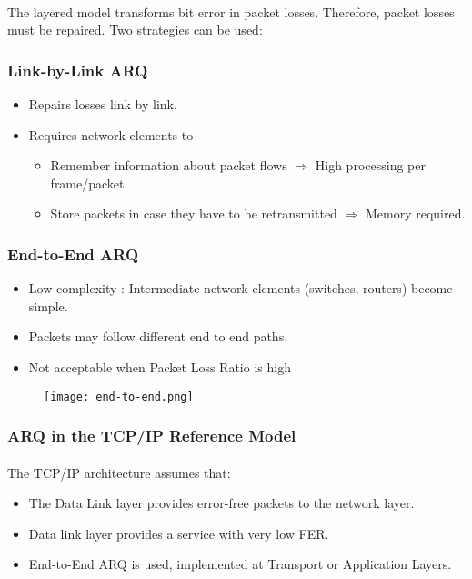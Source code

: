 \documentclass[../resumosRCOM.tex]{subfiles}
\begin{document}
\paragraph{}
The layered model transforms bit error in packet losses.
Therefore, packet losses must be repaired.
Two strategies can be used:
\subsubsection{Link-by-Link ARQ}
\begin{itemize}
    \item Repairs losses link by link.
    \item Requires network elements to 
    \begin{itemize}
        \item Remember information about packet flows $\Rightarrow$ High processing 
        per frame/packet.
        \item Store packets in case they have to be retransmitted $\Rightarrow$
        Memory required.
    \end{itemize}
\end{itemize}
\subsubsection{End-to-End ARQ}
\begin{itemize}
    \item Low complexity : Intermediate network elements (switches, routers) become 
    simple.
    \item Packets may follow different end to end paths.
    \item Not acceptable when Packet Loss Ratio is high
\end{itemize}
\begin{figure}[H]
    \centering
    \texttt{[image: end-to-end.png]}
\end{figure}

\subsubsection{ARQ in the TCP/IP Reference Model}
\paragraph{}
The TCP/IP architecture assumes that:
\begin{itemize}
    \item The Data Link layer provides error-free packets to the network layer.
    \item Data link layer provides a service with very low FER.
    \item End-to-End ARQ is used, implemented at Transport or Application Layers.
\end{itemize}
\end{document}
